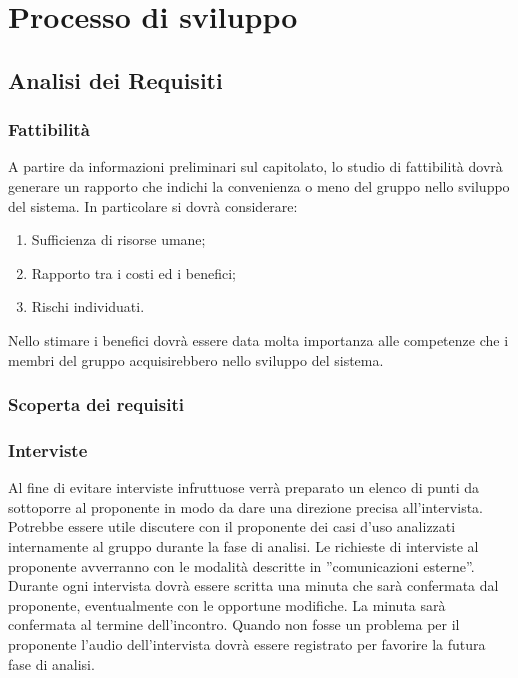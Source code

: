 \section{Processo di sviluppo}
	\subsection{Analisi dei Requisiti}{ 
	   \subsubsection{Fattibilità}{
	    		A partire da informazioni preliminari sul capitolato, lo studio di fattibilità dovrà generare un rapporto che indichi la convenienza o meno del gruppo nello sviluppo del sistema. In particolare si dovrà considerare:
	    		\begin{enumerate}
	    			\item Sufficienza di risorse umane;
	    			\item Rapporto tra i costi ed i benefici;
	    			\item Rischi individuati.
	    		\end{enumerate}
	    		Nello stimare i benefici dovrà essere data molta importanza alle competenze che i membri del gruppo acquisirebbero nello sviluppo del sistema.
	    	 }
		\subsubsection{Scoperta dei requisiti}{
			\subsubsection{Interviste}
			Al fine di evitare interviste infruttuose verrà preparato un elenco di punti da sottoporre al proponente in modo da dare una direzione precisa all’intervista. Potrebbe essere utile discutere con il proponente dei casi d'uso analizzati internamente al gruppo durante la fase di analisi.
			Le richieste di interviste al proponente avverranno con le modalità descritte in ”comunicazioni esterne”. Durante ogni intervista dovrà essere scritta una minuta che sarà confermata dal proponente, eventualmente con le opportune modifiche. La minuta sarà confermata al termine dell’incontro. Quando non fosse un problema per il proponente l’audio dell’intervista dovrà essere registrato per favorire la futura fase di analisi.
}}
